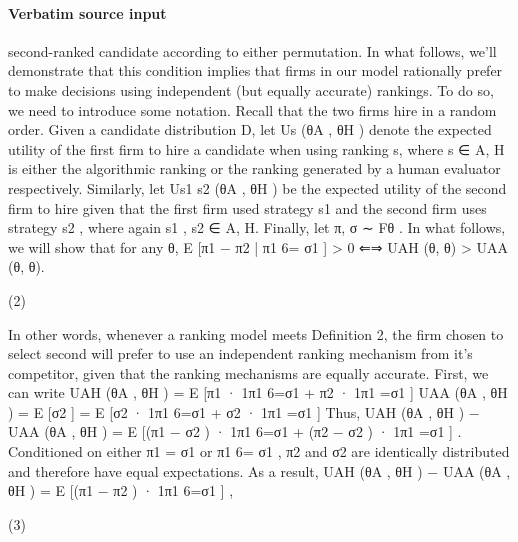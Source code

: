 \documentclass[10pt]{article}
\begin{document}
\paragraph{Verbatim source input}
\begin{ReviewVerbatim}
second-ranked candidate according to either permutation. In what follows, we’ll demonstrate that this
condition implies that firms in our model rationally prefer to make decisions using independent (but equally
accurate) rankings.
To do so, we need to introduce some notation. Recall that the two firms hire in a random order. Given
a candidate distribution D, let Us (θA , θH ) denote the expected utility of the first firm to hire a candidate
when using ranking s, where s ∈ {A, H} is either the algorithmic ranking or the ranking generated by a
human evaluator respectively. Similarly, let Us1 s2 (θA , θH ) be the expected utility of the second firm to hire
given that the first firm used strategy s1 and the second firm uses strategy s2 , where again s1 , s2 ∈ {A, H}.
Finally, let π, σ ∼ Fθ .
In what follows, we will show that for any θ,
E [π1 − π2 | π1 6= σ1 ] > 0 ⇐⇒ UAH (θ, θ) > UAA (θ, θ).

(2)

In other words, whenever a ranking model meets Definition 2, the firm chosen to select second will prefer to
use an independent ranking mechanism from it’s competitor, given that the ranking mechanisms are equally
accurate.
First, we can write
UAH (θA , θH ) = E [π1 · 1π1 6=σ1 + π2 · 1π1 =σ1 ]
UAA (θA , θH ) = E [σ2 ]
= E [σ2 · 1π1 6=σ1 + σ2 · 1π1 =σ1 ]
Thus,
UAH (θA , θH ) − UAA (θA , θH )
= E [(π1 − σ2 ) · 1π1 6=σ1 + (π2 − σ2 ) · 1π1 =σ1 ] .
Conditioned on either π1 = σ1 or π1 6= σ1 , π2 and σ2 are identically distributed and therefore have equal
expectations. As a result,
UAH (θA , θH ) − UAA (θA , θH ) = E [(π1 − π2 ) · 1π1 6=σ1 ] ,

(3)
\end{ReviewVerbatim}
\end{document}
